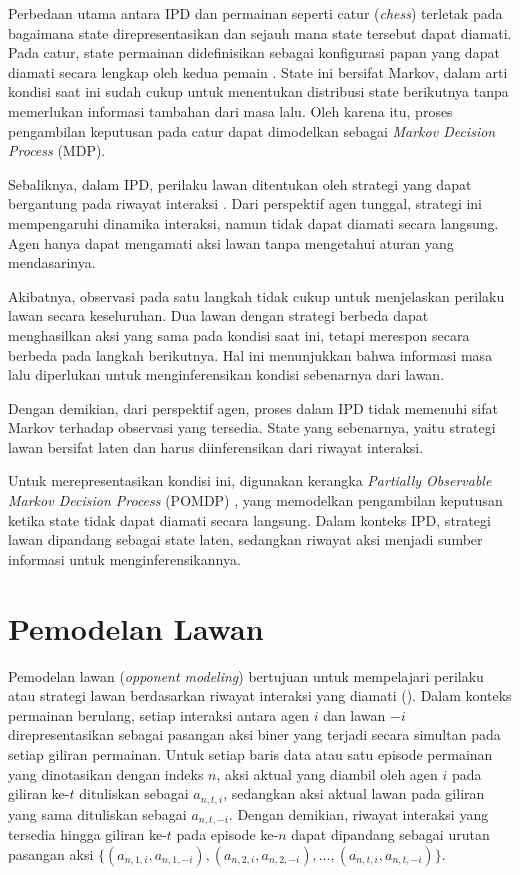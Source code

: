 Perbedaan utama antara IPD dan permainan seperti catur (\textit{chess}) terletak pada bagaimana state direpresentasikan dan sejauh mana state tersebut dapat diamati. Pada catur, state permainan didefinisikan sebagai konfigurasi papan yang dapat diamati secara lengkap oleh kedua pemain \cite{russell_artificial_2016}. State ini bersifat Markov, dalam arti kondisi saat ini sudah cukup untuk menentukan distribusi state berikutnya tanpa memerlukan informasi tambahan dari masa lalu. Oleh karena itu, proses pengambilan keputusan pada catur dapat dimodelkan sebagai \textit{Markov Decision Process} (MDP).

Sebaliknya, dalam IPD, perilaku lawan ditentukan oleh strategi yang dapat bergantung pada riwayat interaksi \cite{axelrod_evolution_1984}. Dari perspektif agen tunggal, strategi ini mempengaruhi dinamika interaksi, namun tidak dapat diamati secara langsung. Agen hanya dapat mengamati aksi lawan tanpa mengetahui aturan yang mendasarinya.

Akibatnya, observasi pada satu langkah tidak cukup untuk menjelaskan perilaku lawan secara keseluruhan. Dua lawan dengan strategi berbeda dapat menghasilkan aksi yang sama pada kondisi saat ini, tetapi merespon secara berbeda pada langkah berikutnya. Hal ini menunjukkan bahwa informasi masa lalu diperlukan untuk menginferensikan kondisi sebenarnya dari lawan.

Dengan demikian, dari perspektif agen, proses dalam IPD tidak memenuhi sifat Markov terhadap observasi yang tersedia. State yang sebenarnya, yaitu strategi lawan bersifat laten dan harus diinferensikan dari riwayat interaksi.

Untuk merepresentasikan kondisi ini, digunakan kerangka \textit{Partially Observable Markov Decision Process} (POMDP) \cite{russell_artificial_2010}, yang memodelkan pengambilan keputusan ketika state tidak dapat diamati secara langsung. Dalam konteks IPD, strategi lawan dipandang sebagai state laten, sedangkan riwayat aksi menjadi sumber informasi untuk menginferensikannya. 


\section{Pemodelan Lawan}

Pemodelan lawan (\textit{opponent modeling}) bertujuan untuk mempelajari perilaku atau strategi lawan berdasarkan riwayat interaksi yang diamati (\cite{shoham_multiagent_2009}). Dalam konteks permainan berulang, setiap interaksi antara agen $i$ dan lawan $-i$ direpresentasikan sebagai pasangan aksi biner yang terjadi secara simultan pada setiap giliran permainan. Untuk setiap baris data atau satu episode permainan yang dinotasikan dengan indeks $n$, aksi aktual yang diambil oleh agen $i$ pada giliran ke-$t$ dituliskan sebagai $a_{n,t,i}$, sedangkan aksi aktual lawan pada giliran yang sama dituliskan sebagai $a_{n,t,-i}$. Dengan demikian, riwayat interaksi yang tersedia hingga giliran ke-$t$ pada episode ke-$n$ dapat dipandang sebagai urutan pasangan aksi $\{(a_{n,1,i}, a_{n,1,-i}), (a_{n,2,i}, a_{n,2,-i}), \dots, (a_{n,t,i}, a_{n,t,-i})\}$.

